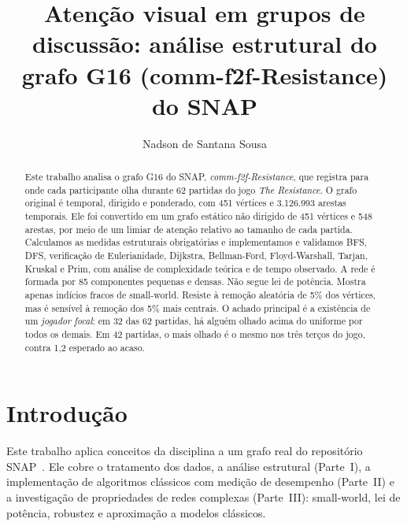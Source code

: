 \documentclass[sigconf]{acmart}
\begin{document}
\title{Atenção visual em grupos de discussão: análise estrutural do grafo G16 (comm-f2f-Resistance) do SNAP}

\author{Nadson de Santana Sousa}

\begin{abstract}
Este trabalho analisa o grafo G16 do SNAP, \textit{comm-f2f-Resistance}, que registra para onde
cada participante olha durante 62 partidas do jogo \textit{The Resistance}. O grafo original é
temporal, dirigido e ponderado, com 451 vértices e 3.126.993 arestas temporais. Ele foi convertido
em um grafo estático não dirigido de 451 vértices e 548 arestas, por meio de um limiar de atenção
relativo ao tamanho de cada partida. Calculamos as medidas estruturais obrigatórias e implementamos
e validamos BFS, DFS, verificação de Eulerianidade, Dijkstra, Bellman-Ford, Floyd-Warshall, Tarjan,
Kruskal e Prim, com análise de complexidade teórica e de tempo observado. A rede é formada por 85
componentes pequenas e densas. Não segue lei de potência. Mostra apenas indícios fracos de
small-world. Resiste à remoção aleatória de 5\% dos vértices, mas é sensível à remoção dos 5\% mais
centrais. O achado principal é a existência de um \textit{jogador focal}: em 32 das 62 partidas, há
alguém olhado acima do uniforme por todos os demais. Em 42 partidas, o mais olhado é o mesmo nos
três terços do jogo, contra 1,2 esperado ao acaso.
\end{abstract}


\maketitle

\section{Introdução}

Este trabalho aplica conceitos da disciplina a um grafo real do repositório SNAP~\cite{snap}. Ele
cobre o tratamento dos dados, a análise estrutural (Parte~I), a implementação de algoritmos clássicos
com medição de desempenho (Parte~II) e a investigação de propriedades de redes complexas (Parte~III):
small-world, lei de potência, robustez e aproximação a modelos clássicos.
\end{document}

